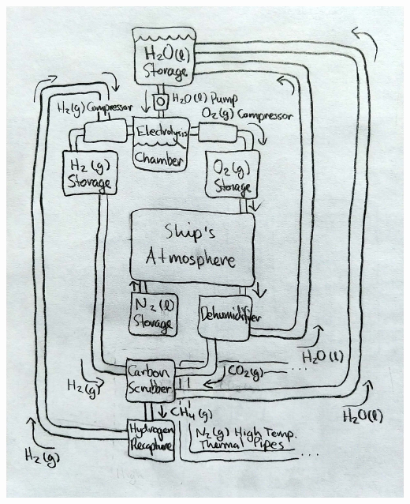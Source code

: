 \documentclass[a4paper]{article}
\begin{document}
\vspace{0.2cm}
\includegraphics[scale=0.275]{Life_Support}
\end{document}
